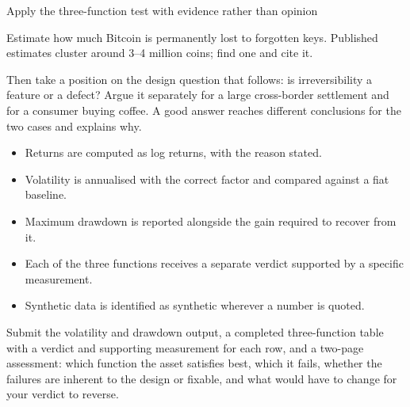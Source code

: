 \begin{labproject}{Apply the three-function test with evidence rather than opinion}
\begin{tryit}
Estimate how much Bitcoin is permanently lost to forgotten keys. Published estimates cluster around 3--4 million coins; find one and cite it.

Then take a position on the design question that follows: is irreversibility a feature or a defect? Argue it separately for a large cross-border settlement and for a consumer buying coffee. A good answer reaches different conclusions for the two cases and explains why.
\end{tryit}
\end{labproject}

\begin{verification}
\begin{itemize}
  \item Returns are computed as log returns, with the reason stated.
  \item Volatility is annualised with the correct factor and compared against a fiat baseline.
  \item Maximum drawdown is reported alongside the gain required to recover from it.
  \item Each of the three functions receives a separate verdict supported by a specific measurement.
  \item Synthetic data is identified as synthetic wherever a number is quoted.
\end{itemize}
\end{verification}

\begin{labdeliverable}
Submit the volatility and drawdown output, a completed three-function table with a verdict and supporting measurement for each row, and a two-page assessment: which function the asset satisfies best, which it fails, whether the failures are inherent to the design or fixable, and what would have to change for your verdict to reverse.
\end{labdeliverable}
